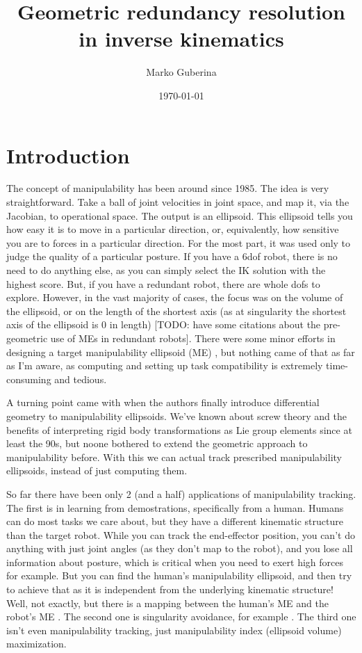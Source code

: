 \documentclass{article}
\title{Geometric redundancy resolution in inverse kinematics}
\date{\today}
\author{Marko Guberina}
\begin{document}
\maketitle


\section{Introduction}
The concept of manipulability has been around since 1985.
The idea is very straightforward. Take a ball of joint velocities in joint space,
and map it, via the Jacobian, to operational space. The output is an ellipsoid.
This ellipsoid tells you how easy it is to move in a particular direction,
or, equivalently, how sensitive you are to forces in a particular direction.
For the most part, it was used only to judge the quality of a particular posture.
If you have a 6dof robot, there is no need to do anything else,
as you can simply select the IK solution with the highest score.
But, if you have a redundant robot, there are whole dofs to explore.
However, in the vast majority of cases, 
the focus was on the volume of the ellipsoid,
or on the length of the shortest axis (as at singularity the shortest axis of the
ellipsoid is 0 in length) [TODO: have some citations about 
the pre-geometric use of MEs in redundant robots].
There were some minor efforts in designing a target manipulability ellipsoid (ME)
\cite{lee1989dual,lee2016humanoid},
but nothing came of that as far as I'm aware,
as computing and setting up task compatibility is extremely time-consuming
and tedious.

A turning point came with \cite{jaquier2021geometry} when the authors
finally introduce differential geometry to manipulability ellipsoids.
We've known about screw theory and the benefits of interpreting
rigid body transformations as Lie group elements since at least the 90s,
but noone bothered to extend the geometric approach to manipulability before.
With this we can actual track prescribed manipulability ellipsoids,
instead of just computing them.

So far there have been only 2 (and a half) applications of 
manipulability tracking.
The first is in learning from demostrations, specifically from a human.
Humans can do most tasks we care about, but they have a different
kinematic structure than the target robot.
While you can track the end-effector position, you can't do anything
with just joint angles (as they don't map to the robot), 
and you lose all information about
posture, which is critical when you need to exert high forces for example.
But you can find the human's manipulability ellipsoid, 
and then try to achieve that
as it is independent from the underlying kinematic structure!
Well, not exactly, but there is a mapping between the human's ME 
and the robot's ME \cite{reithmeir2022human}.
The second one is singularity avoidance, for example \cite{maric2021riemannian}.
The third one isn't even manipulability tracking, just manipulability
index (ellipsoid volume) maximization.
\end{document}
